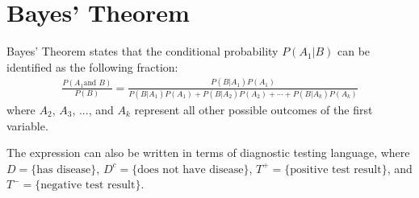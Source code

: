 \documentclass{report}\usepackage[]{graphicx}\usepackage[]{color}
\begin{document}



\section{Bayes' Theorem}

Bayes' Theorem states that the conditional probability $P(A_1 | B)$ can be identified as the following fraction:\vspace{-1.5mm}
\begin{align*}
\frac{P(A_1 \text{and } B)}{P(B)}= \frac{P(B | A_1) P(A_1)}
	{P(B | A_1) P(A_1) + P(B | A_2) P(A_2) + \cdots + P(B | A_k) P(A_k)}
\end{align*}
where $A_2$, $A_3$, ..., and $A_k$ represent all other possible outcomes of the first variable.

The expression can also be written in terms of diagnostic testing language, where $D = \text{\{has disease\}}$, $D^c = \text{\{does not have disease\}}$, $T^{+} = \text{\{positive test result\}}$, and $T^{-} = \text{\{negative test result\}}$.
\end{document}

